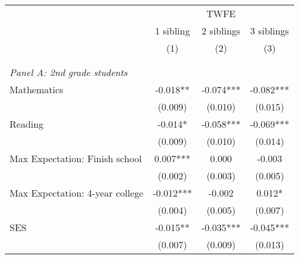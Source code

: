 \makeatletter
{}
{
\makeatother
\begin{tabular}{lccc}
\toprule
\cmidrule(lr){2-4}
& \multicolumn{3}{c}{TWFE}  \\
\cmidrule(lr){2-4}
& 1 sibling & 2 siblings & 3 siblings  \\
\cmidrule(lr){2-2} \cmidrule(lr){3-3} \cmidrule(lr){4-4}
& (1) & (2) & (3)\\
\bottomrule
&  &  &  \\
&  &  &   \\
\multicolumn{4}{l}{\textit{Panel A: 2nd grade students}} \\
\hspace{3mm}Mathematics&      -0.018** &      -0.074***&      -0.082***\\
                    &     (0.009)   &     (0.010)   &     (0.015)   \\
 
\hspace{3mm}Reading &      -0.014*  &      -0.058***&      -0.069***\\
                    &     (0.009)   &     (0.010)   &     (0.014)   \\
 
\hspace{3mm}Max Expectation: Finish school&       0.007***&       0.000   &      -0.003   \\
                    &     (0.002)   &     (0.003)   &     (0.005)   \\
 
\hspace{3mm}Max Expectation: 4-year college&      -0.012***&      -0.002   &       0.012*  \\
                    &     (0.004)   &     (0.005)   &     (0.007)   \\
 
\hspace{3mm}SES     &      -0.015** &      -0.035***&      -0.045***\\
                    &     (0.007)   &     (0.009)   &     (0.013)   \\
 

\end{tabular}}
